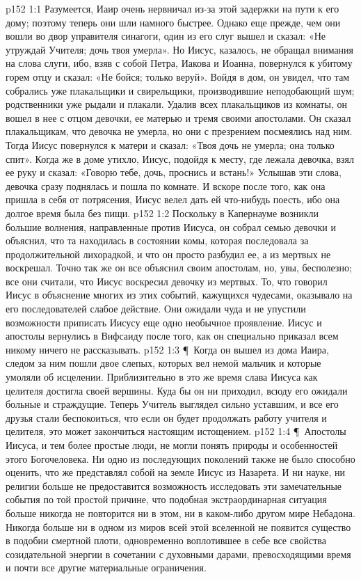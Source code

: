 \vs p152 1:1 Разумеется, Иаир очень нервничал из\hyp{}за этой задержки на пути к его дому; поэтому теперь они шли намного быстрее. Однако еще прежде, чем они вошли во двор управителя синагоги, один из его слуг вышел и сказал: «Не утруждай Учителя; дочь твоя умерла». Но Иисус, казалось, не обращал внимания на слова слуги, ибо, взяв с собой Петра, Иакова и Иоанна, повернулся к убитому горем отцу и сказал: «Не бойся; только веруй». Войдя в дом, он увидел, что там собрались уже плакальщики и свирельщики, производившие неподобающий шум; родственники уже рыдали и плакали. Удалив всех плакальщиков из комнаты, он вошел в нее с отцом девочки, ее матерью и тремя своими апостолами. Он сказал плакальщикам, что девочка не умерла, но они с презрением посмеялись над ним. Тогда Иисус повернулся к матери и сказал: «Твоя дочь не умерла; она только спит». Когда же в доме утихло, Иисус, подойдя к месту, где лежала девочка, взял ее руку и сказал: «Говорю тебе, дочь, проснись и встань!» Услышав эти слова, девочка сразу поднялась и пошла по комнате. И вскоре после того, как она пришла в себя от потрясения, Иисус велел дать ей что\hyp{}нибудь поесть, ибо она долгое время была без пищи.
\vs p152 1:2 Поскольку в Капернауме возникли большие волнения, направленные против Иисуса, он собрал семью девочки и объяснил, что та находилась в состоянии комы, которая последовала за продолжительной лихорадкой, и что он просто разбудил ее, а из мертвых не воскрешал. Точно так же он все объяснил своим апостолам, но, увы, бесполезно; все они считали, что Иисус воскресил девочку из мертвых. То, что говорил Иисус в объяснение многих из этих событий, кажущихся чудесами, оказывало на его последователей слабое действие. Они ожидали чуда и не упустили возможности приписать Иисусу еще одно необычное проявление. Иисус и апостолы вернулись в Вифсаиду после того, как он специально приказал всем никому ничего не рассказывать.
\vs p152 1:3 \P\ Когда он вышел из дома Иаира, следом за ним пошли двое слепых, которых вел немой мальчик и которые умоляли об исцелении. Приблизительно в это же время слава Иисуса как целителя достигла своей вершины. Куда бы он ни приходил, всюду его ожидали больные и страждущие. Теперь Учитель выглядел сильно уставшим, и все его друзья стали беспокоиться, что если он будет продолжать работу учителя и целителя, это может закончиться настоящим истощением.
\vs p152 1:4 \P\ Апостолы Иисуса, и тем более простые люди, не могли понять природы и особенностей этого Богочеловека. Ни одно из последующих поколений также не было способно оценить, что же представлял собой на земле Иисус из Назарета. И ни науке, ни религии больше не предоставится возможность исследовать эти замечательные события по той простой причине, что подобная экстраординарная ситуация больше никогда не повторится ни в этом, ни в каком\hyp{}либо другом мире Небадона. Никогда больше ни в одном из миров всей этой вселенной не появится существо в подобии смертной плоти, одновременно воплотившее в себе все свойства созидательной энергии в сочетании с духовными дарами, превосходящими время и почти все другие материальные ограничения.
